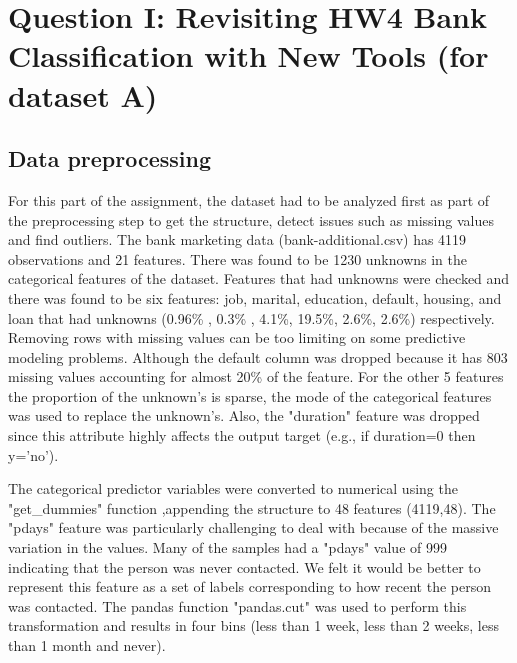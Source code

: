 \section{Question I: Revisiting HW4 Bank Classification with New Tools (for dataset A)}
\subsection{Data preprocessing}
For this part of the assignment, the dataset had to be analyzed first as part of the preprocessing step to get the structure, detect issues such as missing values and find outliers. The bank marketing data (bank-additional.csv) has 4119 observations and 21 features. There was found to be 1230 unknowns in the categorical features of the dataset. Features that had unknowns were checked and there was found to be six features: job, marital, education, default, housing, and  loan that had unknowns (0.96\% , 0.3\% , 4.1\%, 19.5\%, 2.6\%, 2.6\%) respectively. Removing rows with missing values can be too limiting on some predictive modeling problems. Although the default  column was dropped because it has 803 missing values accounting for almost 20\% of the feature. For the other 5 features the proportion of the unknown's is sparse, the mode of the categorical features was used to replace the unknown's. Also, the "duration" feature was dropped since this attribute highly affects the output target (e.g., if duration=0 then y='no').

The categorical predictor variables  were converted  to numerical using the "get\_dummies" function ,appending the structure to 48 features (4119,48).
The "pdays" feature was particularly challenging to deal with because of the massive variation in the values. Many of the samples had a "pdays" value of 999 indicating that the person was never contacted. We felt it would be better to represent this feature as a set of labels corresponding to how recent the person was contacted. The pandas function "pandas.cut" was used to perform this transformation and results in four bins (less than 1 week, less than 2 weeks, less than 1 month and never).

